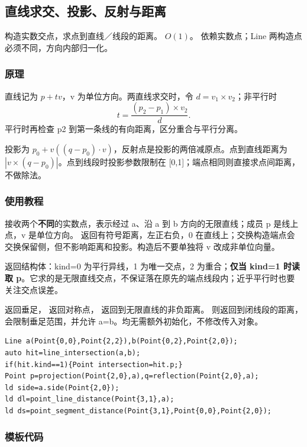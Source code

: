 \subsection{直线求交、投影、反射与距离}
\label{geo:line}
\AlgorithmInfo
    {构造实数交点，求点到直线／线段的距离。}
    {$O(1)$。}
    {依赖实数点；Line 两构造点必须不同，方向内部归一化。}
\subsubsection*{原理}

直线记为 $p+tv$，v 为单位方向。两直线求交时，令 $d=v_1\times v_2$；非平行时
\[
 t=\frac{(p_2-p_1)\times v_2}{d}.
\]
平行时再检查 p2 到第一条线的有向距离，区分重合与平行分离。

投影为 $p_0+v((q-p_0)\cdot v)$，反射点是投影的两倍减原点。点到直线距离为 $|v\times(q-p_0)|$。点到线段时投影参数限制在 [0,1]；端点相同则直接求点间距离，不做除法。

\subsubsection*{使用教程}
 接收两个\textbf{不同}的实数点，表示经过 a、沿 a 到 b 方向的无限直线；成员 p 是线上点，v 是单位方向。 返回有符号距离，左正右负，0 在直线上；交换构造端点会交换保留侧，但不影响距离和投影。构造后不要单独将 v 改成非单位向量。

 返回结构体：kind=0 为平行异线，1 为唯一交点，2 为重合；\textbf{仅当 kind=1 时读取 p}。它求的是无限直线交点，不保证落在原先的端点线段内；近乎平行时也要关注交点误差。

 返回垂足， 返回对称点， 返回到无限直线的非负距离。 则返回到闭线段的距离，会限制垂足范围，并允许 a=b。均无需额外初始化，不修改传入对象。
\begin{lstlisting}[style=mtycpp,numbers=none]
Line a(Point{0,0},Point{2,2}),b(Point{0,2},Point{2,0});
auto hit=line_intersection(a,b);
if(hit.kind==1){Point intersection=hit.p;}
Point p=projection(Point{2,0},a),q=reflection(Point{2,0},a);
ld side=a.side(Point{2,0});
ld dl=point_line_distance(Point{3,1},a);
ld ds=point_segment_distance(Point{3,1},Point{0,0},Point{2,0});
\end{lstlisting}
\subsubsection*{模板代码}
